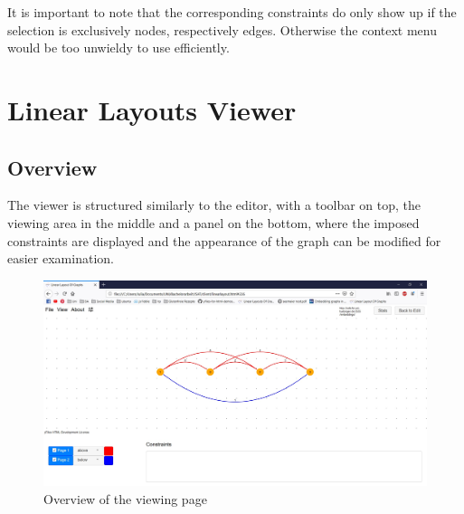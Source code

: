 It is important to note that the corresponding constraints do only show up if the selection is exclusively nodes, respectively edges. Otherwise the context menu would be too unwieldy to use efficiently.
\newpage 
\section{Linear Layouts Viewer}
\subsection{Overview}
The viewer is structured similarly to the editor, with a toolbar on top, the viewing area in the middle and a panel on the bottom, where the imposed constraints are displayed and the appearance of the graph can be modified for easier examination.
\begin{figure}[!h]
\begin{center}
\includegraphics[width=1\textwidth]{figures/figSecond/OverviewSecond.jpg}
\caption{Overview of the viewing page}
\label{img:plzhltr}
\end{center}
\end{figure}
